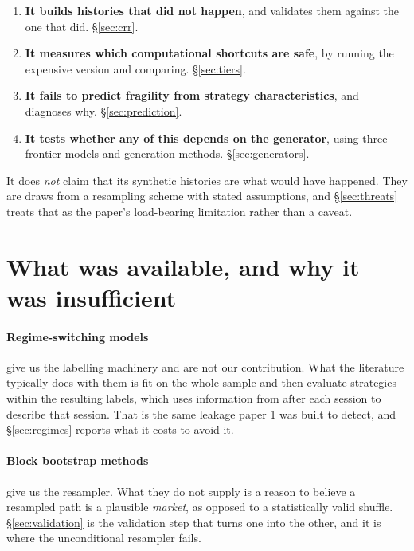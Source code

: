 \documentclass[11pt,a4paper]{article}
\begin{document}
\begin{enumerate}
\item \textbf{It builds histories that did not happen}, and validates them against the one that
  did. \S\ref{sec:crr}.
\item \textbf{It measures which computational shortcuts are safe}, by running the expensive
  version and comparing. \S\ref{sec:tiers}.
\item \textbf{It fails to predict fragility from strategy characteristics}, and diagnoses why.
  \S\ref{sec:prediction}.
\item \textbf{It tests whether any of this depends on the generator}, using three frontier models
  and \pgmParadigmArms{} generation methods. \S\ref{sec:generators}.
\end{enumerate}

It does \emph{not} claim that its synthetic histories are what would have happened. They are draws
from a resampling scheme with stated assumptions, and \S\ref{sec:threats} treats that as the
paper's load-bearing limitation rather than a caveat.

\section{What was available, and why it was insufficient}
\label{sec:related}

\paragraph{Regime-switching models} \citep{hamilton1989,ang2012} give us the labelling machinery and
are not our contribution. What the literature typically does with them is fit on the whole sample
and then evaluate strategies within the resulting labels, which uses information from after each
session to describe that session. That is the same leakage paper 1 was built to detect, and
\S\ref{sec:regimes} reports what it costs to avoid it.

\paragraph{Block bootstrap methods} \citep{efron1979,politis1994,politis2004} give us the resampler.
What they do not supply is a reason to believe a resampled path is a plausible \emph{market}, as
opposed to a statistically valid shuffle. \S\ref{sec:validation} is the validation step that turns
one into the other, and it is where the unconditional resampler fails.
\end{document}
